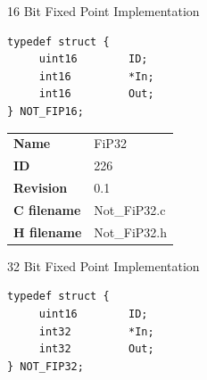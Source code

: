 16 Bit Fixed Point Implementation

\begin{lstlisting}
typedef struct {
     uint16        ID;
     int16         *In;
     int16         Out;
} NOT_FIP16;
\end{lstlisting}

\ifdefined \AddTestReports
{}
\fi
{}
\nopagebreak[0]
\begin{tabular}{l l}
\textbf{Name} & FiP32 \tabularnewline
\textbf{ID} & 226 \tabularnewline
\textbf{Revision} & 0.1 \tabularnewline
\textbf{C filename} & Not\_FiP32.c \tabularnewline
\textbf{H filename} & Not\_FiP32.h \tabularnewline
\end{tabular}
\vspace{1ex}

32 Bit Fixed Point Implementation

\begin{lstlisting}
typedef struct {
     uint16        ID;
     int32         *In;
     int32         Out;
} NOT_FIP32;
\end{lstlisting}

\ifdefined \AddTestReports
{}
\fi
